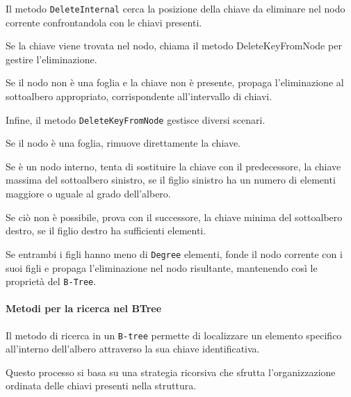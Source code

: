 \documentclass[12pt,a4paper,openright,twoside]{book}
\begin{document}
                    Il metodo \texttt{DeleteInternal} cerca la posizione della chiave da eliminare nel nodo corrente confrontandola con le chiavi presenti.

                    Se la chiave viene trovata nel nodo, chiama il metodo DeleteKeyFromNode per gestire l'eliminazione.

                    Se il nodo non è una foglia e la chiave non è presente, propaga l'eliminazione al sottoalbero appropriato, corrispondente all'intervallo di chiavi.

                    

                    \clearpage

                    Infine, il metodo \texttt{DeleteKeyFromNode} gestisce diversi scenari.

                    Se il nodo è una foglia, rimuove direttamente la chiave.

                    Se è un nodo interno, tenta di sostituire la chiave con il predecessore, la chiave massima del sottoalbero sinistro, se il figlio sinistro ha un numero di elementi maggiore o uguale al grado dell'albero.

                    Se ciò non è possibile, prova con il successore, la chiave minima del sottoalbero destro, se il figlio destro ha sufficienti elementi.

                    Se entrambi i figli hanno meno di \texttt{Degree} elementi, fonde il nodo corrente con i suoi figli e propaga l'eliminazione nel nodo risultante, mantenendo così le proprietà del \texttt{B-Tree}.

                    

                \pagebreak

                \paragraph{Metodi per la ricerca nel BTree}

                    Il metodo di ricerca in un \texttt{B-tree} permette di localizzare un elemento specifico all'interno dell'albero attraverso la sua chiave identificativa.

                    Questo processo si basa su una strategia ricorsiva che sfrutta l'organizzazione ordinata delle chiavi presenti nella struttura.
\end{document}
